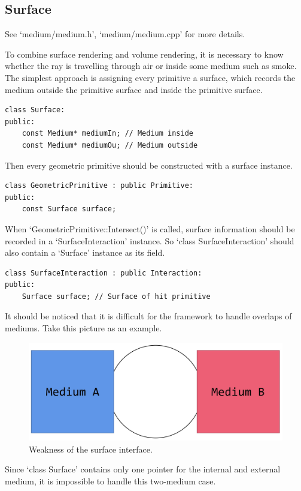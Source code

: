 \documentclass[acmtog]{acmart}
\begin{document}
\subsection{Surface}
    See `medium/medium.h', `medium/medium.cpp' for more details.\par
        To combine surface rendering and volume rendering, 
    it is necessary to know whether the ray is travelling through air or inside some medium such as smoke.
    The simplest approach is assigning every primitive a surface, 
    which records the medium outside the primitive surface and inside the primitive surface.
\begin{lstlisting}
class Surface:
public:
    const Medium* mediumIn; // Medium inside
    const Medium* mediumOu; // Medium outside
\end{lstlisting}
    Then every geometric primitive should be constructed with a surface instance.
\begin{lstlisting}
class GeometricPrimitive : public Primitive:
public:
    const Surface surface;
\end{lstlisting}
    When `GeometricPrimitive::Intersect()' is called, surface information should be recorded in a `SurfaceInteraction' instance.
    So `class SurfaceInteraction' should also contain a `Surface' instance as its field.
\begin{lstlisting}
class SurfaceInteraction : public Interaction:
public:
    Surface surface; // Surface of hit primitive
\end{lstlisting}
    It should be noticed that it is difficult for the framework to handle overlaps of mediums.
    Take this picture as an example.
\begin{figure}[H]
    \includegraphics[scale=0.04]{pictures/surface weakness.png}
    \centering
    \caption{Weakness of the surface interface.}
\end{figure}
        Since `class Surface' contains only one pointer for the internal and external medium, 
    it is impossible to handle this two-medium case.
\end{document}
